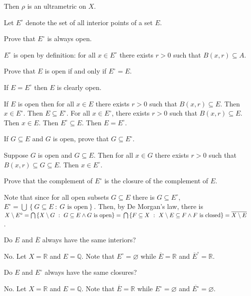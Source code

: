 \documentclass{homework}
\begin{document}
  Then $\rho$ is an ultrametric on $X$.


 Let $E^\circ$ denote the set of all 
  interior points of a set $E$. 

\begin{subproblems}
  \subproblem Prove that $E^\circ$ is always open.

    \solution $E^\circ$ is open by definition: 
    for all $x \in E^\circ$ there exists $r > 0$ such that 
    $B(x, r) \subseteq A$.

  \subproblem Prove that $E$ is open if and only if $E^\circ = E$.
  
    \solution If $E = E^\circ$ then $E$ is clearly open.

    If $E$ is open then for all $x \in E$ there exists $r > 0$ such that 
      $B(x, r) \subseteq E$.
    Then $x \in E^\circ$.
    Then $E \subseteq E^\circ$.
    For all $x \in E^\circ$, there exists $r > 0$ such that 
      $B(x, r) \subseteq E$.
    Then $x \in E$.
    Then $E^\circ \subseteq E$.
    Then $E = E^\circ$.

  \subproblem If $G \subseteq E$ and $G$ is open, prove that 
  $G \subseteq E^\circ$.
  
    \solution Suppose $G$ is open and $G \subseteq E$.
    Then for all $x \in G$ there exists $r > 0$ such that 
      $B(x, r) \subseteq G \subseteq E$.
    Then $x \in E^\circ$.

  \subproblem Prove that the complement of $E^\circ$ is the closure 
  of the complement of $E$.
  
    \solution Note that since for all open subsets $G \subseteq E$ there 
      is $G \subseteq E^\circ$, 
      $E^\circ = \bigcup \left \{ G \subseteq E ~ : ~ 
      G \text{ is open} \right \}$.
    Then, by De Morgan's law, there is $X \setminus E^\circ = \bigcap 
      \left \{ X \setminus G ~ : ~ 
      G \subseteq E \wedge G \text{ is open} \right \} = \\
      \bigcap \left \{ F \subseteq X ~ : ~ 
      X \setminus E \subseteq F \wedge F \text{ is closed} \right \} = 
      \overline{X \setminus E}$.

  \subproblem Do $E$ and $\overline E$ always have the same interiors?
  
    \solution No.
    Let $X = \mathbb R$ and $E = \mathbb Q$.
    Note that $E^\circ = \varnothing$ while $\overline E = \mathbb R$ and 
      $\overline E^\circ = \mathbb R$.

  \subproblem Do $E$ and $E^\circ$ always have the same closures?
  
    \solution No.
    Let $X = \mathbb R$ and $E = \mathbb Q$.
    Note that $\overline E = \mathbb R$ while $E^\circ = \varnothing$ and
      $\overline{E^\circ} = \varnothing$.
\end{subproblems}
\end{document}
